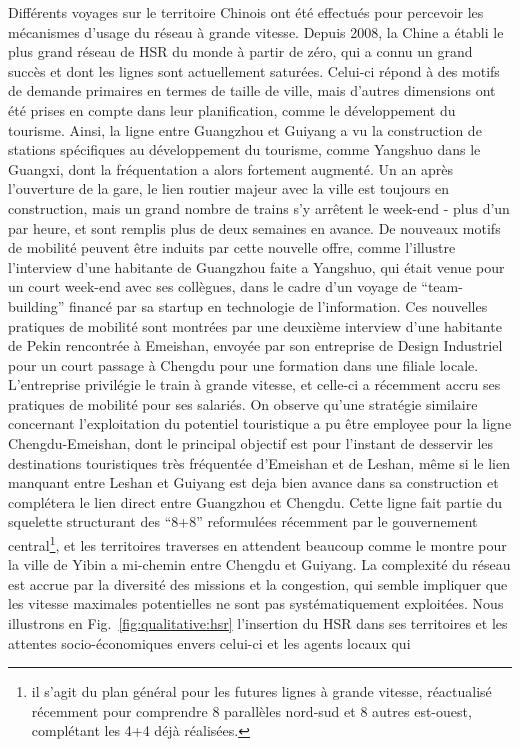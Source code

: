 {Différents voyages sur le territoire Chinois ont été effectués pour percevoir les mécanismes d'usage du réseau à grande vitesse. Depuis 2008, la Chine a établi le plus grand réseau de HSR du monde à partir de zéro, qui a connu un grand succès et dont les lignes sont actuellement saturées. Celui-ci répond à des motifs de demande primaires en termes de taille de ville, mais d'autres dimensions ont été prises en compte dans leur planification, comme le développement du tourisme. Ainsi, la ligne entre Guangzhou et Guiyang a vu la construction de stations spécifiques au développement du tourisme, comme Yangshuo dans le Guangxi, dont la fréquentation a alors fortement augmenté. Un an après l'ouverture de la gare, le lien routier majeur avec la ville est toujours en construction, mais un grand nombre de trains s'y arrêtent le week-end - plus d'un par heure, et sont remplis plus de deux semaines en avance. De nouveaux motifs de mobilité peuvent être induits par cette nouvelle offre, comme l'illustre l'interview d'une habitante de Guangzhou faite a Yangshuo, qui était venue pour un court week-end avec ses collègues, dans le cadre d'un voyage de ``team-building'' financé par sa startup en technologie de l'information. Ces nouvelles pratiques de mobilité sont montrées par une deuxième interview d'une habitante de Pekin rencontrée à Emeishan, envoyée par son entreprise de Design Industriel pour un court passage à Chengdu pour une formation dans une filiale locale. L'entreprise privilégie le train à grande vitesse, et celle-ci a récemment accru ses pratiques de mobilité pour ses salariés. On observe qu'une stratégie similaire concernant l'exploitation du potentiel touristique a pu être employee pour la ligne Chengdu-Emeishan, dont le principal objectif est pour l'instant de desservir les destinations touristiques très fréquentée d'Emeishan et de Leshan, même si le lien manquant entre Leshan et Guiyang est deja bien avance dans sa construction et complétera le lien direct entre Guangzhou et Chengdu. Cette ligne fait partie du squelette structurant des ``8+8'' reformulées récemment par le gouvernement central\footnote{il s'agit du plan général pour les futures lignes à grande vitesse, réactualisé récemment pour comprendre 8 parallèles nord-sud et 8 autres est-ouest, complétant les 4+4 déjà réalisées.}, et les territoires traverses en attendent beaucoup comme le montre \cite{lu2012chengdu} pour la ville de Yibin a mi-chemin entre Chengdu et Guiyang. La complexité du réseau est accrue par la diversité des missions et la congestion, qui semble impliquer que les vitesse maximales potentielles ne sont pas systématiquement exploitées. Nous illustrons en Fig.~\ref{fig:qualitative:hsr} l'insertion du HSR dans ses territoires et les attentes socio-économiques envers celui-ci et les agents locaux qui }
